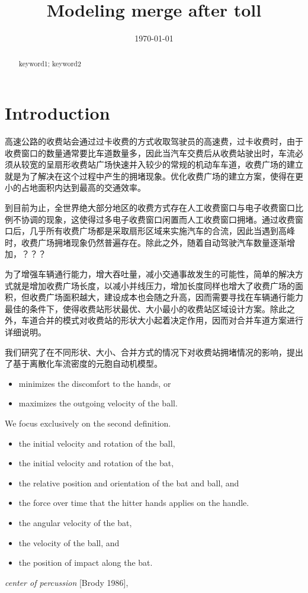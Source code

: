 \documentclass{mcmthesis}
\title{Modeling merge after toll}
\date{\today}
\begin{document}
\begin{abstract}
\lipsum[1]
\begin{keywords}
keyword1; keyword2
\end{keywords}
\end{abstract}
\maketitle
\section{Introduction}
高速公路的收费站会通过过卡收费的方式收取驾驶员的高速费，过卡收费时，由于收费窗口的数量通常要比车道数量多，因此当汽车交费后从收费站驶出时，车流必须从较宽的呈扇形收费站广场快速并入较少的常规的机动车车道，收费广场的建立就是为了解决在这个过程中产生的拥堵现象。优化收费广场的建立方案，使得在更小的占地面积内达到最高的交通效率。

到目前为止，全世界绝大部分地区的收费方式存在人工收费窗口与电子收费窗口比例不协调的现象，这使得过多电子收费窗口闲置而人工收费窗口拥堵。通过收费窗口后，几乎所有收费广场都是采取扇形区域来实施汽车的合流，因此当遇到高峰时，收费广场拥堵现象仍然普遍存在。除此之外，随着自动驾驶汽车数量逐渐增加，？？？

为了增强车辆通行能力，增大吞吐量，减小交通事故发生的可能性，简单的解决方式就是增加收费广场长度，以减小并线压力，增加长度同样也增大了收费广场的面积，但收费广场面积越大，建设成本也会随之升高，因而需要寻找在车辆通行能力最佳的条件下，使得收费站形状最优、大小最小的收费站区域设计方案。除此之外，车道合并的模式对收费站的形状大小起着决定作用，因而对合并车道方案进行详细说明。

我们研究了在不同形状、大小、合并方式的情况下对收费站拥堵情况的影响，提出了基于离散化车流密度的元胞自动机模型。

\begin{itemize}
\item minimizes the discomfort to the hands, or
\item maximizes the outgoing velocity of the ball.
\end{itemize}
We focus exclusively on the second definition.

\begin{itemize}
\item the initial velocity and rotation of the ball,
\item the initial velocity and rotation of the bat,
\item the relative position and orientation of the bat and ball, and
\item the force over time that the hitter hands applies on the handle.
\end{itemize}
\lipsum[3]
\begin{itemize}
\item the angular velocity of the bat,
\item the velocity of the ball, and
\item the position of impact along the bat.
\end{itemize}
\lipsum[4]
\emph{center of percussion} [Brody 1986], \lipsum[5]
\end{document}
